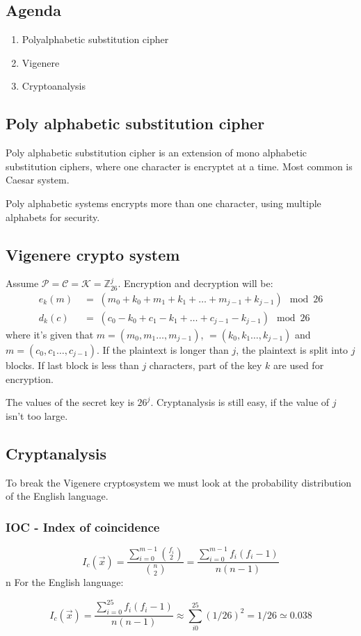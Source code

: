

\subsection{Agenda}
\begin{enumerate}
\item Polyalphabetic substitution cipher
\item Vigenere
\item Cryptoanalysis
\end{enumerate}

\subsection{Poly alphabetic substitution cipher}

Poly alphabetic substitution cipher is an extension of mono alphabetic
substitution ciphers, where one character is encryptet at a time. Most common is Caesar system.

Poly alphabetic systems encrypts more than one character, using
multiple alphabets for security.

\subsection{Vigenere crypto system}

Assume $\mathcal{P} = \mathcal{C} = \mathcal{K} =
\mathbb{Z}_{26}^j$. Encryption and decryption will be:
\begin{align*}
  e_{k}(m) \; &= \; (m_0+k_0 +m_1+k_1 + \ldots
  +m_{j-1}+k_{j-1} )  \mod 26\\
  d_{k}(c) \; &= \; (c_0-k_0 +c_1-k_1 + \ldots +c_{j-1}-k_{j-1} ) \mod 26
\end{align*}
where it's given that $m=(m_0,m_1 \ldots,m_{j-1})$, $=(k_0,k_1
\ldots,k_{j-1})$ and $m=(c_0,c_1 \ldots,c_{j-1})$. If the plaintext is
longer than $j$, the plaintext is split into $j$ blocks. If last block
is less than $j$ characters, part of the key $k$ are used for
encryption.

The values of the secret key is $26^j$. Cryptanalysis is still easy,
if the value of $j$ isn't too large.
\subsection{Cryptanalysis}
To break the Vigenere cryptosystem we must look at the probability
distribution of the English language.
\subsubsection{IOC - Index of coincidence}

\[ I_c(\vec{x}) =
\frac{\sum^{m-1}_{i=0}\binom{f_i}{2}}{\binom{n}{2}}=
\frac{\sum^{m-1}_{i=0}f_i(f_i - 1)}{n(n-1)}\]
n
For the English language:

\[ I_c(\vec{x}) =
\frac{\sum^{25}_{i=0}f_i(f_i - 1)}{n(n-1)} \approx
\sum^{25}_{i0}(1/26)^2= 1/26 \simeq 0.038\]
